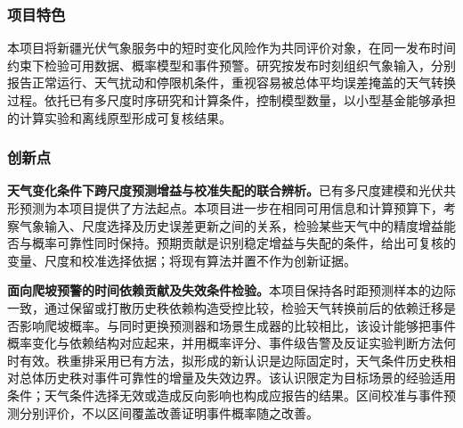 \justifying
\NSFCBodyText

\subsubsection{项目特色}
本项目将新疆光伏气象服务中的短时变化风险作为共同评价对象，在同一发布时间约束下检验可用数据、概率模型和事件预警。研究按发布时刻组织气象输入，分别报告正常运行、天气扰动和停限机条件，重视容易被总体平均误差掩盖的天气转换过程。依托已有多尺度时序研究和计算条件，控制模型数量，以小型基金能够承担的计算实验和离线原型形成可复核结果。

\subsubsection{创新点}
\textbf{天气变化条件下跨尺度预测增益与校准失配的联合辨析。}已有多尺度建模和光伏共形预测为本项目提供了方法起点。本项目进一步在相同可用信息和计算预算下，考察气象输入、尺度选择及历史误差更新之间的关系，检验某些天气中的精度增益能否与概率可靠性同时保持。预期贡献是识别稳定增益与失配的条件，给出可复核的变量、尺度和校准选择依据；将现有算法并置不作为创新证据。

\textbf{面向爬坡预警的时间依赖贡献及失效条件检验。}本项目保持各时距预测样本的边际一致，通过保留或打散历史秩依赖构造受控比较，检验天气转换前后的依赖迁移是否影响爬坡概率。与同时更换预测器和场景生成器的比较相比，该设计能够把事件概率变化与依赖结构对应起来，并用概率评分、事件级告警及反证实验判断方法何时有效。秩重排采用已有方法，拟形成的新认识是边际固定时，天气条件历史秩相对总体历史秩对事件可靠性的增量及失效边界。该认识限定为目标场景的经验适用条件；天气条件选择无效或造成反向影响也构成应报告的结果。区间校准与事件预测分别评价，不以区间覆盖改善证明事件概率随之改善。
